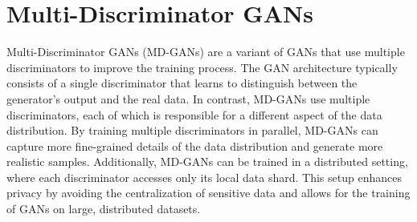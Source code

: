 \section{Multi-Discriminator GANs}
Multi-Discriminator GANs (MD-GANs) are a variant of GANs that use multiple discriminators to improve the training process. The GAN architecture typically consists of a single discriminator that learns to distinguish between the generator's output and the real data. In contrast, MD-GANs use multiple discriminators, each of which is responsible for a different aspect of the data distribution. By training multiple discriminators in parallel, MD-GANs can capture more fine-grained details of the data distribution and generate more realistic samples. Additionally, MD-GANs can be trained in a distributed setting, where each discriminator accesses only its local data shard. This setup enhances privacy by avoiding the centralization of sensitive data and allows for the training of GANs on large, distributed datasets.

